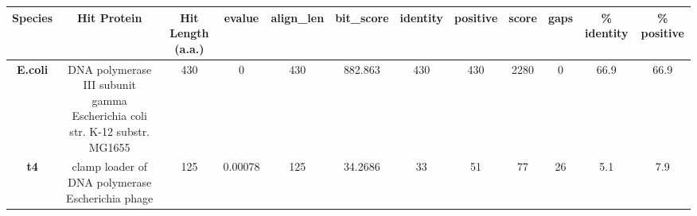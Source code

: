 \begin{tabular}{|c|c|c|c|c|c|c|c|c|c|c|c|} \hline
\textbf{Species} & \textbf{Hit Protein} & \textbf{Hit Length (a.a.)} & \textbf{evalue} & \textbf{align\_len} & \textbf{bit\_score} & \textbf{identity} & \textbf{positive} & \textbf{score} & \textbf{gaps} & \textbf{\% identity} & \textbf{\% positive} \\ \hline
\textbf{E.coli} & DNA polymerase III subunit gamma Escherichia coli str. K-12 substr. MG1655 & 430 & 0 & 430 & 882.863 & 430 & 430 & 2280 & 0 & 66.9 & 66.9\\
\textbf{t4} & clamp loader of DNA polymerase Escherichia phage  & 125 & 0.00078 & 125 & 34.2686 & 33 & 51 & 77 & 26 & 5.1 & 7.9\\
\hline \end{tabular}
